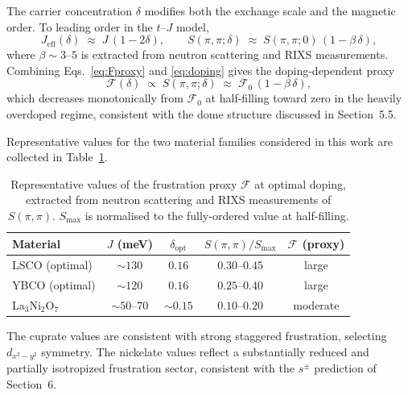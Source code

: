     The carrier concentration $\delta$ modifies both the exchange scale and the magnetic order.
    To leading order in the $t$--$J$ model,
    \begin{equation}
      J_\textrm{eff}(\delta) \;\approx\; J\,(1 - 2\delta), \qquad
      S(\pi,\pi;\delta) \;\approx\; S(\pi,\pi;0)\,(1 - \beta\,\delta),
      \label{eq:doping}
    \end{equation}
    where $\beta \sim 3$--$5$ is extracted from neutron scattering and RIXS measurements.
    Combining Eqs.~\eqref{eq:Fproxy} and \eqref{eq:doping} gives the doping-dependent proxy
    \begin{equation}
      \mathcal{F}(\delta) \;\propto\; S(\pi,\pi;\delta)
      \;\approx\; \mathcal{F}_0\,(1 - \beta\,\delta),
      \label{eq:Fdoping}
    \end{equation}
    which decreases monotonically from $\mathcal{F}_0$ at half-filling toward zero in the
    heavily overdoped regime, consistent with the dome structure discussed in Section~5.5.

    Representative values for the two material families considered in this work are collected in
    Table~\ref{tab:Fvalues}.

    \begin{table}[h]
      \centering
      \caption{Representative values of the frustration proxy $\mathcal{F}$ at optimal doping,
        extracted from neutron scattering and RIXS measurements of $S(\pi,\pi)$.
        $S_{\max}$ is normalised to the fully-ordered value at half-filling.}
      \label{tab:Fvalues}
      \begin{tabular}{lcccc}
        \hline
        Material & $J$ (meV) & $\delta_\textrm{opt}$ &
        $S(\pi,\pi)/S_{\max}$ & $\mathcal{F}$ (proxy) \\
        \hline
        LSCO (optimal)     & $\sim 130$      & $0.16$      & $0.30$--$0.45$ & large    \\
        YBCO (optimal)     & $\sim 120$      & $0.16$      & $0.25$--$0.40$ & large    \\
        La$_3$Ni$_2$O$_7$ & $\sim 50$--$70$ & $\sim 0.15$ & $0.10$--$0.20$ & moderate \\
        \hline
      \end{tabular}
    \end{table}

    The cuprate values are consistent with strong staggered frustration, selecting
    $d_{x^2-y^2}$ symmetry.
    The nickelate values reflect a substantially reduced and partially isotropized frustration
    sector, consistent with the $s^\pm$ prediction of Section~6.

